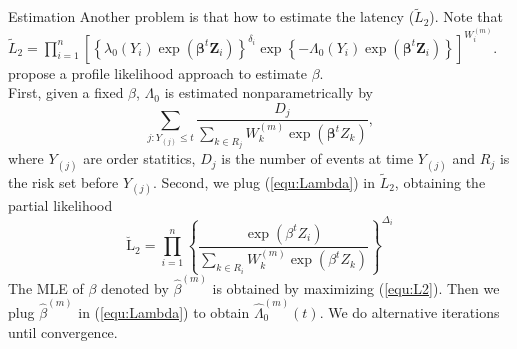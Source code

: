 \documentclass[10 pt]{beamer}
\begin{document}
\begin{frame}{Estimation}
	Another problem is that how to estimate the latency ($\tilde{L}_2$). Note that 
	$\tilde{L}_2=\prod_{i=1}^{n}\left[\left\{\lambda_{0}\left(Y_{i}\right) \exp \left(\boldsymbol{\beta}^{t} \boldsymbol{Z}_{i}\right)\right\}^{\delta_{i}} \exp \left\{-\Lambda_{0}\left(Y_{i}\right) \exp \left(\boldsymbol{\beta}^{t} \boldsymbol{Z}_{i}\right)\right\}\right]^{W_{i}^{(m)}}.$\\
	\cite{Sy2000} propose a profile likelihood approach to estimate $\beta$.\\
	First, given a fixed $\beta$, $\Lambda_{0}$ is estimated nonparametrically by 
	\begin{equation}\label{equ:Lambda}
		\sum_{j: Y_{(j)} \leq t} \frac{D_{j}}{\sum_{k \in R_{j}} W_{k}^{(m)} \exp \left(\boldsymbol{\beta}^{t} {Z}_{k}\right)},
	\end{equation}
	where $Y_{(j)}$ are order statitics, $D_j$ is the number of events at time $Y_{(j)}$ and $R_j$ is the risk set before $Y_{(j)}$.
	Second, we plug (\ref{equ:Lambda}) in $\tilde{L}_2$, obtaining the partial likelihood
	\begin{equation}\label{equ:L2}
		\breve{\mathrm{L}}_{2}=\prod_{i=1}^{n}\left\{\frac{\exp \left({\beta}^{t} {Z}_{i}\right)}{\sum_{k \in R_{i}} W_{k}^{(m)} \exp \left({\beta}^{t} {Z}_{k}\right)}\right\}^{\Delta_{i}}
	\end{equation}
	The MLE of $\beta$ denoted by $\hat{\beta}^{(m)}$ is obtained by maximizing (\ref{equ:L2}). Then we plug $\hat{\beta}^{(m)}$ in (\ref{equ:Lambda}) to obtain $\hat{\Lambda}_0^{(m)}(t)$. We do alternative iterations until convergence.
\end{frame}
\end{document}
